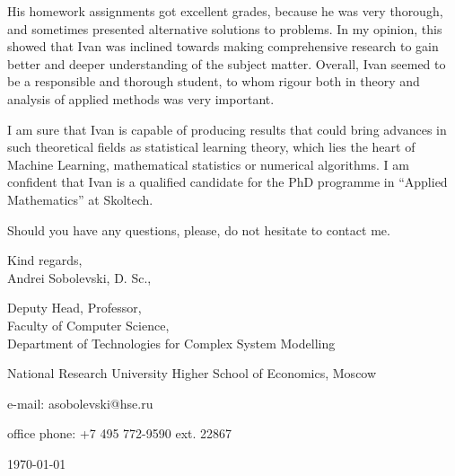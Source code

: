 \documentclass[14pt]{extarticle}
\begin{document}
His homework assignments got excellent grades, because he was very thorough, and
sometimes presented alternative solutions to problems. In my opinion, this showed
that Ivan was inclined towards making comprehensive research to gain better and deeper
understanding of the subject matter. Overall, Ivan seemed to be a responsible and
thorough student, to whom rigour both in theory and analysis of applied methods was
very important. \par\medskip

I am sure that Ivan is capable of producing results that could bring advances in such
theoretical fields as statistical learning theory, which lies the heart of Machine Learning,
mathematical statistics or numerical algorithms. I am confident that Ivan is a qualified
candidate for the PhD programme in ``Applied Mathematics'' at Skoltech. \par\medskip

Should you have any questions, please, do not hesitate to contact me. \par\bigskip

\hfill\par
Kind regards, \\
Andrei Sobolevski, D. Sc., \par
Deputy Head, Professor, \\
Faculty of Computer Science, \\
Department of Technologies for Complex System Modelling \par
National Research University Higher School of Economics, Moscow \par

\hfill\par
e-mail: asobolevski@hse.ru \par
office phone: +7 495 772-9590 ext. 22867
\hfill\par
\hfill\today

\end{document}
